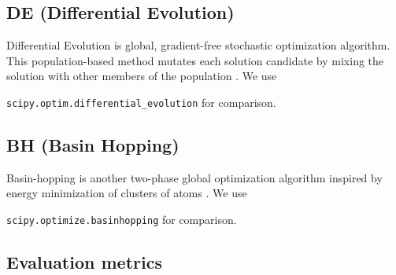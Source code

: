 



%    

%    


\subsection{DE (Differential Evolution)}
\label{compare:de}

Differential Evolution is global, gradient-free stochastic optimization algorithm. This population-based method mutates
each solution candidate by mixing the solution with other members of the  population \cite{storn}.
We use

\noindent\texttt{scipy.optim.differential\_evolution} for comparison.

\subsection{BH (Basin Hopping)}
\label{compare:bh}

Basin-hopping is another two-phase global optimization algorithm inspired by energy minimization of clusters of atoms \cite{wales}.
We use

\noindent\texttt{scipy.optimize.basinhopping} for comparison.


\subsection{Evaluation metrics}

